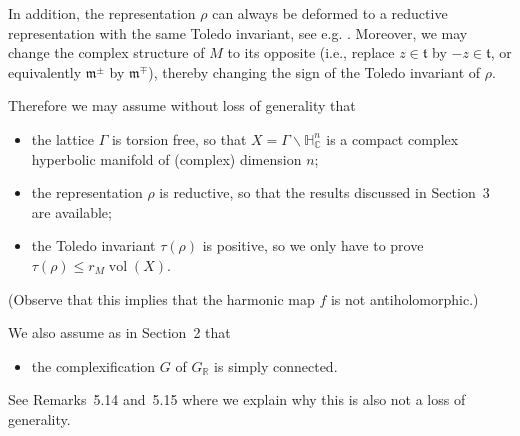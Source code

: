 \documentclass[10pt]{article}
\theoremstyle{definition}
\numberwithin{equation}{section}
\begin{document}
In addition, the representation $\rho$ can always be deformed to a reductive representation with the same Toledo invariant, see e.g. \cite[Lem.~4.11]{jep93KM17}. Moreover, we may change the complex structure of $M$ to its opposite (i.e., replace $z\in\mathfrak t$ by $-z\in\mathfrak t$, or equivalently $\mathfrak m^{\pm}$ by $\mathfrak m^{\mp}$), thereby changing the sign of the Toledo invariant of $\rho$.

Therefore we may assume without loss of generality that
\begin{itemize}
\item the lattice $\Gamma$ is torsion free, so that $X=\Gamma\backslash\mathbb H^n_{\mathbb C}$ is a compact complex hyperbolic manifold of (complex) dimension $n$;
\item the representation $\rho$ is reductive, so that the results discussed in Section~3 are available;
\item the Toledo invariant $\tau(\rho)$ is positive, so we only have to prove $\tau(\rho)\leqslant r_M\operatorname{vol}(X)$.
\end{itemize}
(Observe that this implies that the harmonic map $f$ is not antiholomorphic.)

We also assume as in Section~2 that
\begin{itemize}\item the complexification $G$ of $G_{\mathbb R}$ is simply connected.\end{itemize}
See Remarks~5.14 and~5.15 where we explain why this is also not a loss of generality.
\end{document}
